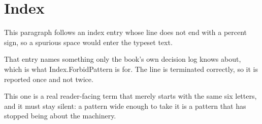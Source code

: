 \section{Index}
\label{sec:ch01-index}

This paragraph follows an index entry whose line does not end with a percent
sign, so a spurious space would enter the typeset text.

%
That entry names something only the book's own decision log knows about, which
is what Index.ForbidPattern is for. The line is terminated correctly, so it is
reported once and not twice.

%
This one is a real reader-facing term that merely starts with the same six
letters, and it must stay silent: a pattern wide enough to take it is a pattern
that has stopped being about the machinery.
